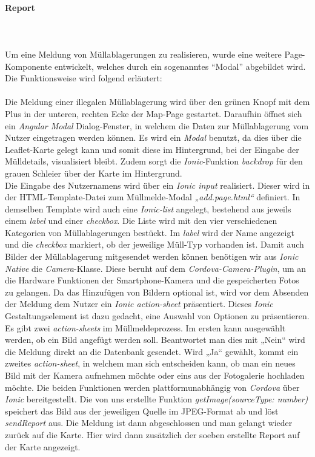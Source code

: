 \documentclass[a4paper, 11pt, DIV=11, listof=numbered, numbers=noenddot]{scrartcl}
\begin{document}
	\paragraph{Report}
	\textbf{}\\
	\textbf{}\\
	Um eine Meldung von Müllablagerungen zu realisieren, wurde eine weitere Page-Komponente entwickelt, welches durch ein sogenanntes \enquote{Modal} abgebildet wird.
	Die Funktionsweise wird folgend erläutert:\\
	\textbf{}\\
	Die Meldung einer illegalen Müllablagerung wird über den grünen Knopf mit dem Plus in der unteren, rechten Ecke der Map-Page gestartet. Daraufhin öffnet sich ein \textit{Angular Modal} Dialog-Fenster, in welchem die Daten zur Müllablagerung vom Nutzer eingetragen werden können. Es wird ein \textit{Modal} benutzt, da dies über die Leaflet-Karte gelegt kann und somit diese im Hintergrund, bei der Eingabe der Mülldetails, visualisiert bleibt. Zudem sorgt die \textit{Ionic}-Funktion \textit{backdrop} für den grauen Schleier über der Karte im Hintergrund.\\
	Die Eingabe des Nutzernamens wird über ein \textit{Ionic input} realisiert. Dieser wird in der HTML-Template-Datei zum Müllmelde-Modal \textit{„add.page.html“} definiert. In demselben Template wird auch eine \textit{Ionic-list} angelegt, bestehend aus jeweils einem \textit{label} und einer \textit{checkbox}. Die Liste wird mit den vier verschiedenen Kategorien von Müllablagerungen bestückt. Im \textit{label} wird der Name angezeigt und die \textit{checkbox} markiert, ob der jeweilige Müll-Typ vorhanden ist.
	Damit auch Bilder der Müllablagerung mitgesendet werden können benötigen wir aus \textit{Ionic Native} die \textit{Camera}-Klasse. Diese beruht auf dem \textit{Cordova-Camera-Plugin}, um an die Hardware Funktionen der Smartphone-Kamera und die gespeicherten Fotos zu gelangen. Da das Hinzufügen von Bildern optional ist, wird vor dem Absenden der Meldung dem Nutzer ein \textit{Ionic action-sheet} präsentiert. Dieses \textit{Ionic} Gestaltungselement ist dazu gedacht, eine Auswahl von Optionen zu präsentieren. Es gibt zwei \textit{action-sheets} im Müllmeldeprozess. Im ersten kann ausgewählt werden, ob ein Bild angefügt werden soll. Beantwortet man dies mit „Nein“ wird die Meldung direkt an die Datenbank gesendet. Wird „Ja“ gewählt, kommt ein zweites \textit{action-sheet}, in welchem man sich entscheiden kann, ob man ein neues Bild mit der Kamera aufnehmen möchte oder eins aus der Fotogalerie hochladen möchte. Die beiden Funktionen werden plattformunabhängig von \textit{Cordova} über \textit{Ionic} bereitgestellt. Die von uns erstellte Funktion \textit{getImage(sourceType: number)} speichert das Bild aus der jeweiligen Quelle im JPEG-Format ab und löst \textit{sendReport} aus. Die Meldung ist dann abgeschlossen und man gelangt wieder zurück auf die Karte. Hier wird dann zusätzlich der soeben erstellte Report auf der Karte angezeigt.\\
\end{document}
